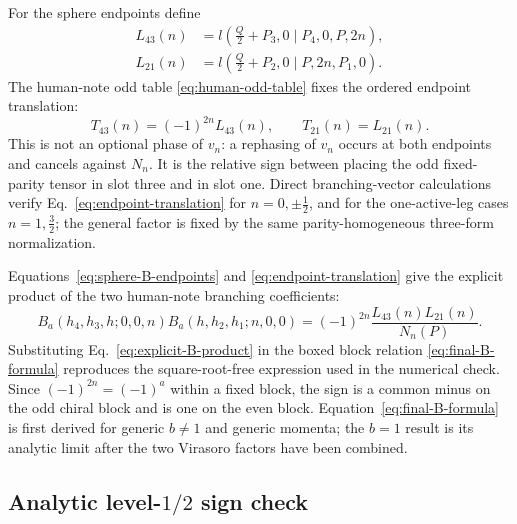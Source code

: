 \documentclass[11pt]{article}
\begin{document}
For the sphere endpoints define
\begin{align}
 L_{43}(n)
 &=l\left(\frac Q2+P_3,0\mid P_4,0,P,2n\right),
 \nonumber\\
 L_{21}(n)
 &=l\left(\frac Q2+P_2,0\mid P,2n,P_1,0\right).
 \label{eq:sphere-l-factors}
\end{align}
The human-note odd table \eqref{eq:human-odd-table} fixes the ordered endpoint
translation:
\begin{equation}
 \boxed{T_{43}(n)=(-1)^{2n}L_{43}(n),\qquad
 T_{21}(n)=L_{21}(n).}
 \label{eq:endpoint-translation}
\end{equation}
This is not an optional phase of \(v_n\): a rephasing of \(v_n\) occurs at
both endpoints and cancels against \(N_n\).  It is the relative sign between
placing the odd fixed-parity tensor in slot three and in slot one.  Direct
branching-vector calculations verify Eq.~\eqref{eq:endpoint-translation} for
\(n=0,\pm\frac12\), and for the one-active-leg cases \(n=1,\frac32\); the
general factor is fixed by the same parity-homogeneous three-form
normalization.

Equations~\eqref{eq:sphere-B-endpoints} and
\eqref{eq:endpoint-translation} give the explicit product of the two
human-note branching coefficients:
\begin{equation}
 \boxed{
 B_a(h_4,h_3,h;0,0,n)B_a(h,h_2,h_1;n,0,0)
 =(-1)^{2n}\frac{L_{43}(n)L_{21}(n)}{N_n(P)}.}
 \label{eq:explicit-B-product}
\end{equation}
Substituting Eq.~\eqref{eq:explicit-B-product} in the boxed block relation
\eqref{eq:final-B-formula} reproduces the square-root-free expression used in
the numerical check.  Since \((-1)^{2n}=(-1)^a\) within a fixed block, the
sign is a common minus on the odd chiral block and is one on the even block.
Equation~\eqref{eq:final-B-formula} is first derived for generic \(b\ne1\)
and generic momenta; the \(b=1\) result is its analytic limit after the two
Virasoro factors have been combined.

\subsection{Analytic \texorpdfstring{level-\(1/2\)}{level-1/2} sign check}
\end{document}
